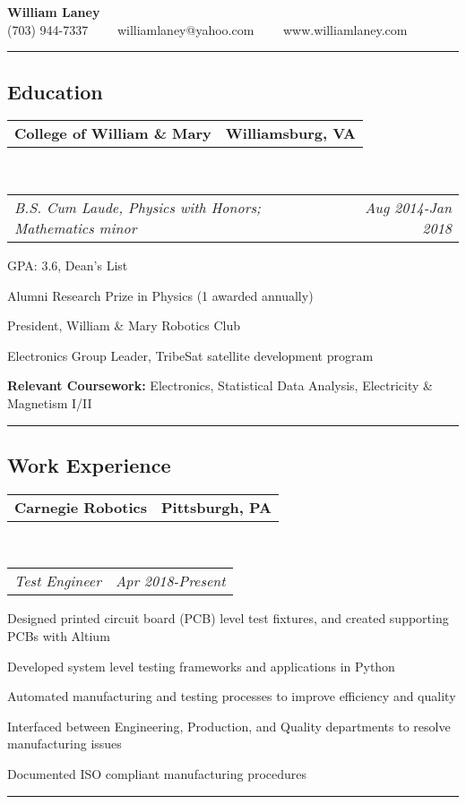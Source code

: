 \documentclass[10pt,letterpaper]{article}
\makeatletter
\newcommand{\headerrow}[2]
{\begin{tabular*}{\linewidth}{l@{\extracolsep{\fill}}r}
	#1 &
	#2 \\
\end{tabular*}}
\makeatother
\begin{document}
\begin{center}
{\LARGE \textbf{William Laney}}\\
\vspace{0.1em}
(703) 944-7337\ \ \textbullet
\ \ williamlaney@yahoo.com\ \ \textbullet
\ \ www.williamlaney.com
\end{center}

\hrule
\vspace{-0.4em}
\subsection*{Education}

	\headerrow
		{\textbf{College of William \& Mary}}
		{\textbf{Williamsburg, VA}}
	\\
	\headerrow
		{\emph{B.S. Cum Laude, Physics with Honors; Mathematics minor}}
		{\emph{Aug 2014-Jan 2018}}
	\begin{itemize*}
		\item GPA: 3.6, Dean's List
		\item Alumni Research Prize in Physics (1 awarded annually)
		\item President, William \& Mary Robotics Club
		\item Electronics Group Leader, TribeSat satellite development program
		\item \textbf{Relevant Coursework:} Electronics, Statistical Data Analysis, Electricity \& Magnetism I/II
	\end{itemize*}


\hrule
\vspace{-0.4em}
\subsection*{Work Experience}
\headerrow
		{\textbf{Carnegie Robotics}}
		{\textbf{Pittsburgh, PA}}
	\\
	\headerrow
		{\emph{Test Engineer}}
		{\emph{Apr 2018-Present}}
	\begin{itemize*}
		\item Designed printed circuit board (PCB) level test fixtures, and created supporting PCBs with Altium
		\item Developed system level testing frameworks and applications in Python
		\item Automated manufacturing and testing processes to improve efficiency and quality
		\item Interfaced between Engineering, Production, and Quality departments to resolve manufacturing issues
		\item Documented ISO compliant manufacturing procedures
	\end{itemize*}
\hrule
\vspace{-0.4em}
\end{document}
